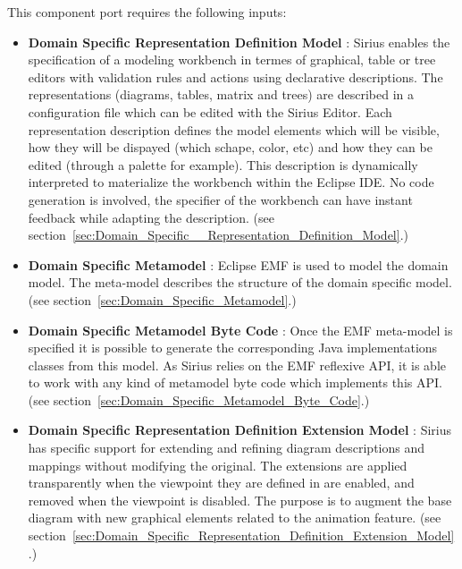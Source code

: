 \documentclass{gemoc} %
\begin{document}
This component port requires the following inputs:
\begin{itemize}
  \item \textbf{Domain Specific  Representation Definition Model} :
Sirius enables the specification of a modeling workbench in termes of graphical, table or tree editors with validation rules and actions using declarative descriptions. The representations (diagrams, tables, matrix and trees) are described in a configuration file which can be edited with the Sirius Editor. Each representation description defines the model elements which will be visible, how they will be dispayed (which schape, color, etc) and how they can be edited (through a palette for example). This description is dynamically interpreted to materialize the workbench within the Eclipse IDE. No code generation is involved, the specifier of the workbench can have instant feedback while adapting the description.  
(see section~\ref{sec:Domain_Specific__Representation_Definition_Model}.)
  \item \textbf{Domain Specific Metamodel} :
Eclipse EMF is used to model the domain model. The meta-model describes the structure of the domain specific model.
(see section~\ref{sec:Domain_Specific_Metamodel}.)
  \item \textbf{Domain Specific Metamodel Byte Code} :
Once the EMF meta-model is specified it is possible to generate the corresponding Java implementations classes from this model. As Sirius relies on the EMF reflexive API, it is able to work with any kind of metamodel byte code which implements this API.
(see section~\ref{sec:Domain_Specific_Metamodel_Byte_Code}.)
  \item \textbf{Domain Specific Representation Definition Extension Model} :
Sirius has specific support for extending and refining diagram descriptions and mappings without modifying the original. The extensions are applied transparently when the viewpoint they are defined in are enabled, and removed when the viewpoint is disabled.  The purpose is to augment the base diagram with new graphical elements related to the animation feature.
(see section~\ref{sec:Domain_Specific_Representation_Definition_Extension_Model}.)
\end{itemize}
\end{document}

